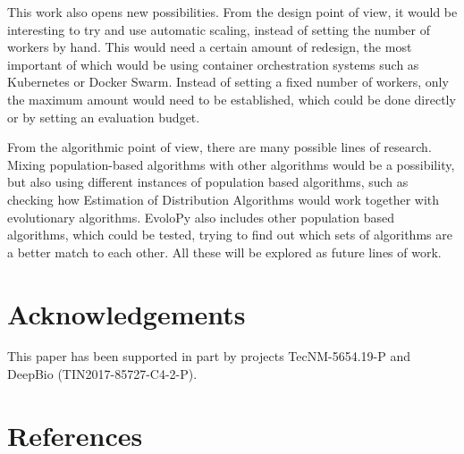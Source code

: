 \documentclass[review]{elsarticle}
\begin{document}

This work also opens new possibilities. From the design point of view, it
would be interesting to try and use automatic scaling, instead of
setting the number of workers by hand. This would need a certain
amount of redesign, the most important of which would be using
container orchestration systems such as Kubernetes or Docker
Swarm. Instead of setting a fixed number of workers, only the maximum
amount would need to be established, which could be done directly or
by setting an evaluation budget.

From the algorithmic point of view, there are many possible lines of
research. Mixing population-based algorithms with other algorithms
would be a possibility, but also using different instances of
population based algorithms, such as checking how Estimation of
Distribution Algorithms would work together with evolutionary
algorithms. EvoloPy also includes other population based algorithms,
which could be tested, trying to find out which sets of algorithms are
a better match to each other. All these will be explored as future
lines of work.

\section{Acknowledgements}

This paper has been supported in part by projects TecNM-5654.19-P and DeepBio
(TIN2017-85727-C4-2-P).

\section*{References}



\end{document}
